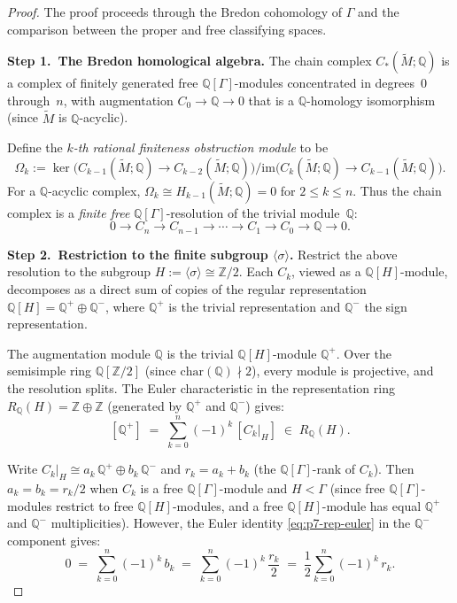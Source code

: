 \begin{proof}
The proof proceeds through the Bredon cohomology of $\Gamma$ and the
comparison between the proper and free classifying spaces.

\textbf{Step 1.\ The Bredon homological algebra.}
The chain complex $C_*(\widetilde{M};\mathbb{Q})$ is a complex of finitely
generated free $\mathbb{Q}[\Gamma]$-modules concentrated in degrees~$0$
through~$n$, with augmentation $C_0\to\mathbb{Q}\to 0$ that is a
$\mathbb{Q}$-homology isomorphism (since $\widetilde{M}$ is
$\mathbb{Q}$-acyclic).

Define the \emph{$k$-th rational finiteness obstruction module} to be
\[
  \Omega_k
  :=
  \ker\bigl(C_{k-1}(\widetilde{M};\mathbb{Q})\to C_{k-2}(\widetilde{M};\mathbb{Q})\bigr)
  \Big/
  \mathrm{im}\bigl(C_k(\widetilde{M};\mathbb{Q})\to C_{k-1}(\widetilde{M};\mathbb{Q})\bigr).
\]
For a $\mathbb{Q}$-acyclic complex, $\Omega_k \cong H_{k-1}(\widetilde{M};\mathbb{Q})=0$
for $2\le k\le n$. Thus the chain complex is a \emph{finite free}
$\mathbb{Q}[\Gamma]$-resolution of the trivial module~$\mathbb{Q}$:
\[
  0 \to C_n \to C_{n-1} \to \cdots \to C_1 \to C_0 \to \mathbb{Q} \to 0.
\]

\textbf{Step 2.\ Restriction to the finite subgroup $\langle\sigma\rangle$.}
Restrict the above resolution to the subgroup
$H:=\langle\sigma\rangle\cong\mathbb{Z}/2$. Each $C_k$, viewed as a
$\mathbb{Q}[H]$-module, decomposes as a direct sum of copies of the regular
representation $\mathbb{Q}[H] = \mathbb{Q}^+\oplus\mathbb{Q}^-$, where
$\mathbb{Q}^+$ is the trivial representation and $\mathbb{Q}^-$ the sign
representation.

The augmentation module $\mathbb{Q}$ is the trivial $\mathbb{Q}[H]$-module
$\mathbb{Q}^+$. Over the semisimple ring $\mathbb{Q}[\mathbb{Z}/2]$ (since
$\mathrm{char}(\mathbb{Q})\nmid 2$), every module is projective, and
the resolution splits. The Euler characteristic in the representation ring
$R_\mathbb{Q}(H) = \mathbb{Z}\oplus\mathbb{Z}$ (generated by
$\mathbb{Q}^+$ and $\mathbb{Q}^-$) gives:
\begin{equation}
\label{eq:p7-rep-euler}
[\mathbb{Q}^+]
\;=\;
\sum_{k=0}^n (-1)^k\, [C_k|_H]
\;\in\; R_\mathbb{Q}(H).
\end{equation}

Write $C_k|_H \cong a_k\,\mathbb{Q}^+ \oplus b_k\,\mathbb{Q}^-$ and
$r_k = a_k + b_k$ (the $\mathbb{Q}[\Gamma]$-rank of $C_k$). Then
$a_k = b_k = r_k/2$ when $C_k$ is a free $\mathbb{Q}[\Gamma]$-module and
$H < \Gamma$ (since free $\mathbb{Q}[\Gamma]$-modules restrict to free
$\mathbb{Q}[H]$-modules, and a free $\mathbb{Q}[H]$-module has equal
$\mathbb{Q}^+$ and $\mathbb{Q}^-$ multiplicities). However, the Euler identity
\eqref{eq:p7-rep-euler} in the $\mathbb{Q}^-$ component gives:
\begin{equation}
\label{eq:p7-sign-euler}
0 \;=\; \sum_{k=0}^n (-1)^k\, b_k
\;=\; \sum_{k=0}^n (-1)^k\, \frac{r_k}{2}
\;=\; \frac{1}{2}\sum_{k=0}^n(-1)^k\,r_k.
\end{equation}


\end{proof}
